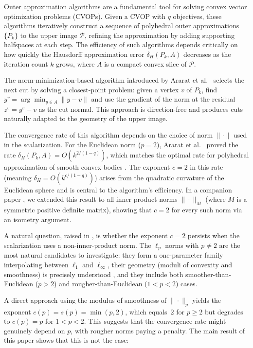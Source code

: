 \documentclass[11pt]{article}
\begin{document}
Outer approximation algorithms are a fundamental tool for solving convex vector optimization problems (CVOPs). Given a CVOP with $q$ objectives, these algorithms iteratively construct a sequence of polyhedral outer approximations $\{P_k\}$ to the upper image $\mathcal{P}$, refining the approximation by adding supporting halfspaces at each step. The efficiency of such algorithms depends critically on how quickly the Hausdorff approximation error $\delta_H(P_k, A)$ decreases as the iteration count $k$ grows, where $A$ is a compact convex slice of $\mathcal{P}$.

The norm-minimization-based algorithm introduced by Ararat et al.\ \cite{Ararat2022} selects the next cut by solving a closest-point problem: given a vertex $v$ of $P_k$, find $y^v = \arg\min_{y \in A} \|y - v\|$ and use the gradient of the norm at the residual $z^v = y^v - v$ as the cut normal. This approach is direction-free and produces cuts naturally adapted to the geometry of the upper image.

The convergence rate of this algorithm depends on the choice of norm $\|\cdot\|$ used in the scalarization. For the Euclidean norm ($p = 2$), Ararat et al.\ \cite{Ararat2024} proved the rate $\delta_H(P_k, A) = O(k^{2/(1-q)})$, which matches the optimal rate for polyhedral approximation of smooth convex bodies \cite{Gruber1993,Gruber1993a,Glasauer1997}. The exponent $c = 2$ in this rate (meaning $\delta_H = O(k^{c/(1-q)})$) arises from the quadratic curvature of the Euclidean sphere and is central to the algorithm's efficiency. In a companion paper \cite{Alshahrani2026}, we extended this result to all inner-product norms $\|\cdot\|_M$ (where $M$ is a symmetric positive definite matrix), showing that $c = 2$ for every such norm via an isometry argument.

A natural question, raised in \cite{Alshahrani2026}, is whether the exponent $c = 2$ persists when the scalarization uses a non-inner-product norm. The $\ell_p$ norms with $p \neq 2$ are the most natural candidates to investigate: they form a one-parameter family interpolating between $\ell_1$ and $\ell_\infty$, their geometry (moduli of convexity and smoothness) is precisely understood \cite{Clarkson1936,Hanner1956,Ball1994,Lindenstrauss1996}, and they include both smoother-than-Euclidean ($p > 2$) and rougher-than-Euclidean ($1 < p < 2$) cases.

A direct approach using the modulus of smoothness of $\|\cdot\|_p$ yields the exponent $c(p) = s(p) = \min(p, 2)$, which equals~$2$ for $p \ge 2$ but degrades to $c(p) = p$ for $1 < p < 2$. This suggests that the convergence rate might genuinely depend on $p$, with rougher norms paying a penalty. The main result of this paper shows that this is not the case:
\end{document}
